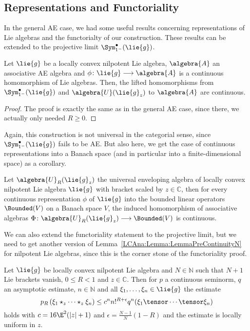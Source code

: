 \subsection{Representations and Functoriality}
\label{subsec:NilpotentFunctorialityRepresentations}

In the general AE case, we had some useful results concerning representations 
of Lie algebras and the functorialty of our construction. These results can be 
extended to the projective limit $\Sym_{1^-}^{\bullet}(\lie{g})$.
\begin{proposition}
	\label{Nilpot:Prop:UnivProperty}
	Let $\lie{g}$ be a locally convex nilpotent Lie algebra, $\algebra{A}$ an 
	associative AE algebra and $\phi \colon \lie{g} \longrightarrow 
	\algebra{A}$ is a continuous homomorphism of Lie algebras. Then, the 
	lifted homomorphisms from $\Sym_{1^-}^{\bullet}(\lie{g})$ and 
	$\algebra{U}(\lie{g}_z)$ to $\algebra{A}$ are continuous.
\end{proposition}
\begin{proof}
	The proof is exactly the same as in the general AE case, since there, 
	we actually only needed $R \geq 0$.
\end{proof}
Again, this construction is not universal in the categorial sense, 
since $\Sym_{1^-}^{\bullet}(\lie{g})$ fails to be AE. But also here, we get 
the case of continuous representations into a Banach space (and in particular 
into a finite-dimensional space) as a corollary.
\begin{corollary}
    \label{Nilpot:Coro:ContinuousRepresentations}%
    Let $\algebra{U}_R(\lie{g}_z)$ the universal enveloping algebra of locally 
    convex nilpotent Lie algebra $\lie{g}$ with bracket scaled by $z \in 
    \mathbb{C}$, then for every continuous 
    representation $\phi$ of $\lie{g}$ into the bounded linear operators 
    $\Bounded(V)$ on a Banach space $V$, the induced homomorphism of 
    associative algebras $\Phi \colon \algebra{U}_R(\lie{g}_z) \longrightarrow 
    \Bounded(V)$ is continuous.
\end{corollary}
We can also extend the functoriality statement to the projective limit, but we 
need to get another version of Lemma~\ref{LCAna:Lemma:LemmaPreContinuityN} for 
nilpotent Lie algebras, since this is the corner stone of the functoriality 
proof.
\begin{lemma}
    \label{Lemma:Nilpot:LemmaPreContinuityN}%
    Let $\lie{g}$ be locally convex nilpotent Lie algebra and $N \in 
    \mathbb{N}$ such that $N + 1$ Lie brackets vanish, $0 \leq R < 1$ and 
    $z \in \mathbb{C}$. Then for $p$ a continuous seminorm, $q$ an
    asymptotic estimate, $n \in \mathbb{N}$ and all $\xi_1, \ldots,
    \xi_n \in \lie{g}$ the estimate
    \begin{equation}
        \label{Nilpot:LemmaPreContinuityN}
        p_R \left(
            \xi_1 \star_z \cdots \star_z \xi_n
        \right)
        \leq
        c^n n!^{R + \epsilon}
        q^n(\xi_1 \tensor \cdots \tensor \xi_n)
    \end{equation}
    holds with $c = 16 \E^2 (|z| + 1)$ and $\epsilon = \frac{N-1}{N}(1 - R)$
    and the estimate is locally uniform in $z$.
\end{lemma}

